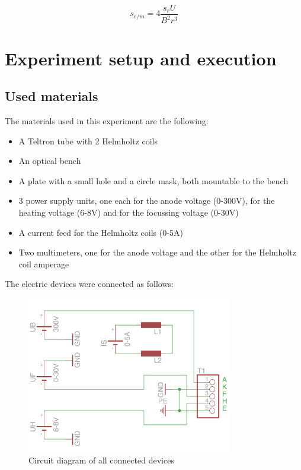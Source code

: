 \documentclass{scrreprt}
\begin{document}
\begin{equation}
s_{e/m} = 4 \frac{s_r U}{B^2 r^3}
\end{equation}

\section{Experiment setup and execution}

\subsection{Used materials}
The materials used in this experiment are the following:
\begin{itemize}
\item A Teltron tube with 2 Helmholtz coils
\item An optical bench
\item A plate with a small hole and a circle mask, both mountable to the bench
\item 3 power supply units, one each for the anode voltage (0-300V), for the heating voltage (6-8V) and for the focussing voltage (0-30V)
\item A current feed for the Helmholtz coils (0-5A)
\item Two multimeters, one for the anode voltage and the other for the Helmholtz coil amperage
\end{itemize}

The electric devices were connected as follows:

\begin{figure}[H]
	\centering
  \includegraphics[width=0.8\textwidth]{img/schaltplan.png}
	\caption{Circuit diagram of all connected devices}
	\label{fig:circuit}
\end{figure}
\end{document}
